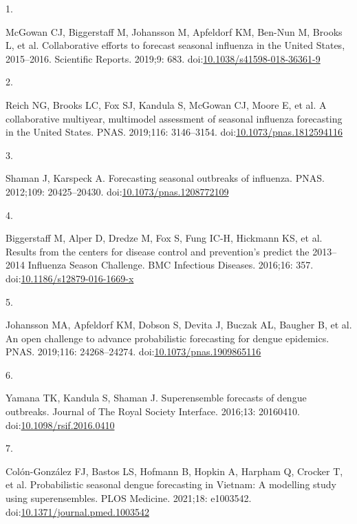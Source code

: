 \documentclass[10pt,letterpaper]{article}
\newlength{\cslhangindent}
\newlength{\csllabelwidth}
\newlength{\cslentryspacingunit} %
\newenvironment{CSLReferences}[2] %
 {%
  \setlength{\parindent}{0pt}
  \ifodd #1
  \let\oldpar\par
  \def\par{\hangindent=\cslhangindent\oldpar}
  \fi
  \setlength{\parskip}{#2\cslentryspacingunit}
 }%
 {}
\newcommand{\CSLLeftMargin}[1]{\parbox[t]{\csllabelwidth}{#1}}
\newcommand{\CSLRightInline}[1]{\parbox[t]{\linewidth - \csllabelwidth}{#1}\break}
\begin{document}
\hypertarget{refs}{}
\begin{CSLReferences}{0}{0}
\leavevmode{}%
\CSLLeftMargin{1. }
\CSLRightInline{McGowan CJ, Biggerstaff M, Johansson M, Apfeldorf KM,
Ben-Nun M, Brooks L, et al. Collaborative efforts to forecast seasonal
influenza in the {United States}, 2015--2016. Scientific Reports.
2019;9: 683.
doi:\href{https://doi.org/10.1038/s41598-018-36361-9}{10.1038/s41598-018-36361-9}}

\leavevmode{}%
\CSLLeftMargin{2. }
\CSLRightInline{Reich NG, Brooks LC, Fox SJ, Kandula S, McGowan CJ,
Moore E, et al. A collaborative multiyear, multimodel assessment of
seasonal influenza forecasting in the {United States}. PNAS. 2019;116:
3146--3154.
doi:\href{https://doi.org/10.1073/pnas.1812594116}{10.1073/pnas.1812594116}}

\leavevmode{}%
\CSLLeftMargin{3. }
\CSLRightInline{Shaman J, Karspeck A. Forecasting seasonal outbreaks of
influenza. PNAS. 2012;109: 20425--20430.
doi:\href{https://doi.org/10.1073/pnas.1208772109}{10.1073/pnas.1208772109}}

\leavevmode{}%
\CSLLeftMargin{4. }
\CSLRightInline{Biggerstaff M, Alper D, Dredze M, Fox S, Fung IC-H,
Hickmann KS, et al. Results from the centers for disease control and
prevention's predict the 2013--2014 {Influenza Season Challenge}. BMC
Infectious Diseases. 2016;16: 357.
doi:\href{https://doi.org/10.1186/s12879-016-1669-x}{10.1186/s12879-016-1669-x}}

\leavevmode{}%
\CSLLeftMargin{5. }
\CSLRightInline{Johansson MA, Apfeldorf KM, Dobson S, Devita J, Buczak
AL, Baugher B, et al. An open challenge to advance probabilistic
forecasting for dengue epidemics. PNAS. 2019;116: 24268--24274.
doi:\href{https://doi.org/10.1073/pnas.1909865116}{10.1073/pnas.1909865116}}

\leavevmode{}%
\CSLLeftMargin{6. }
\CSLRightInline{Yamana TK, Kandula S, Shaman J. Superensemble forecasts
of dengue outbreaks. Journal of The Royal Society Interface. 2016;13:
20160410.
doi:\href{https://doi.org/10.1098/rsif.2016.0410}{10.1098/rsif.2016.0410}}

\leavevmode{}%
\CSLLeftMargin{7. }
\CSLRightInline{Colón-González FJ, Bastos LS, Hofmann B, Hopkin A,
Harpham Q, Crocker T, et al. Probabilistic seasonal dengue forecasting
in {Vietnam}: {A} modelling study using superensembles. PLOS Medicine.
2021;18: e1003542.
doi:\href{https://doi.org/10.1371/journal.pmed.1003542}{10.1371/journal.pmed.1003542}}


\end{CSLReferences}
\end{document}

